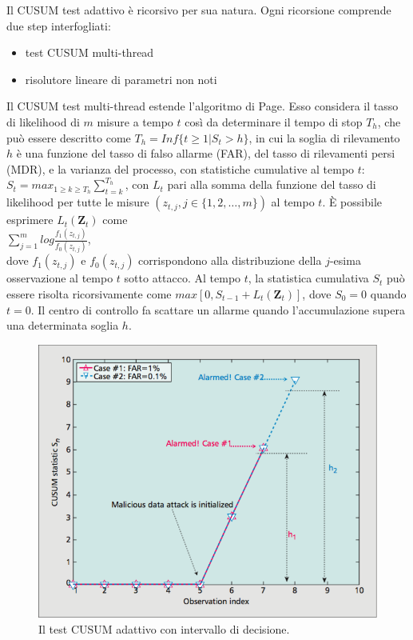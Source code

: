 Il CUSUM test adattivo è ricorsivo per sua natura. Ogni ricorsione comprende due step interfogliati:
\begin{itemize}
	\item test CUSUM multi-thread
	\item risolutore lineare di parametri non noti
\end{itemize}
Il CUSUM test multi-thread estende l'algoritmo di Page. Esso considera il tasso di likelihood di $m$ misure a tempo $t$ così da determinare il tempo di stop $T_h$, che può essere descritto come $T_h = Inf\lbrace t \geq 1 | S_t > h \rbrace$, in cui la soglia di rilevamento $h$ è una funzione del tasso di falso allarme (FAR), del tasso di rilevamenti persi (MDR), e la varianza del processo, con statistiche cumulative al tempo $t$: $S_t = max_{1\geq k \geq T_h}\sum_{t=k}^{T_h}$, con $L_t$ pari alla somma della funzione del tasso di likelihood per tutte le misure $(z_{t,j}, j \in \lbrace1, 2, \ldots, m\rbrace)$ al tempo $t$. È possibile esprimere $L_t(\textbf{Z}_t)$ come\\
\indent $\sum_{j=1}^{m}log\frac{f_1(z_{t,j})}{f_0(z_{t,j})}$,\\
dove $f_1(z_{t,j})$ e $f_0(z_{t,j})$ corrispondono alla distribuzione della $j$-esima osservazione al tempo $t$ sotto attacco. Al tempo $t$, la statistica cumulativa $S_t$ può essere risolta ricorsivamente come $max[0, S_{t-1} + L_t(\textbf{Z}_t)]$, dove $S_0 = 0$ quando $t = 0$. Il centro di controllo fa scattare un allarme quando l'accumulazione supera una determinata soglia $h$.\\
\begin{figure}[h]
	\centering
	\includegraphics[scale=.3]{imgs/attack/adaptive_CUSUM.png}
	\caption{Il test CUSUM adattivo con intervallo di decisione.}
	\label{cusum_img}
\end{figure}

